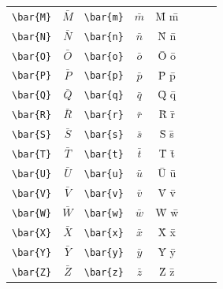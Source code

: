 \documentclass[12pt,a4paper]{article}
\begin{document}
\begin{longtable}{|l|c|l|c|c|l|c|c|}
\verb|\bar{M}|     & $\bar{M}$       & \verb|\bar{m}|     & $\bar{m}$       & M̄ m̄            &                 &                 & \\
\verb|\bar{N}|     & $\bar{N}$       & \verb|\bar{n}|     & $\bar{n}$       & N̄ n̄            &                 &                 & \\
\verb|\bar{O}|     & $\bar{O}$       & \verb|\bar{o}|     & $\bar{o}$       & Ō ō            &                 &                 & \\
\verb|\bar{P}|     & $\bar{P}$       & \verb|\bar{p}|     & $\bar{p}$       & P̄ p̄            &                 &                 & \\
\verb|\bar{Q}|     & $\bar{Q}$       & \verb|\bar{q}|     & $\bar{q}$       & Q̄ q̄            &                 &                 & \\
\verb|\bar{R}|     & $\bar{R}$       & \verb|\bar{r}|     & $\bar{r}$       & R̄ r̄            &                 &                 & \\
\verb|\bar{S}|     & $\bar{S}$       & \verb|\bar{s}|     & $\bar{s}$       & S̄ s̄            &                 &                 & \\
\verb|\bar{T}|     & $\bar{T}$       & \verb|\bar{t}|     & $\bar{t}$       & T̄ t̄            &                 &                 & \\
\verb|\bar{U}|     & $\bar{U}$       & \verb|\bar{u}|     & $\bar{u}$       & Ū ū            &                 &                 & \\
\verb|\bar{V}|     & $\bar{V}$       & \verb|\bar{v}|     & $\bar{v}$       & V̄ v̄            &                 &                 & \\
\verb|\bar{W}|     & $\bar{W}$       & \verb|\bar{w}|     & $\bar{w}$       & W̄ w̄            &                 &                 & \\
\verb|\bar{X}|     & $\bar{X}$       & \verb|\bar{x}|     & $\bar{x}$       & X̄ x̄            &                 &                 & \\
\verb|\bar{Y}|     & $\bar{Y}$       & \verb|\bar{y}|     & $\bar{y}$       & Ȳ ȳ            &                 &                 & \\
\verb|\bar{Z}|     & $\bar{Z}$       & \verb|\bar{z}|     & $\bar{z}$       & Z̄ z̄            &                 &                 & \\
\hline
\end{longtable}

\newpage
\end{document}
